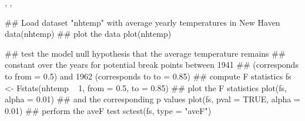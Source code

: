 \begin{SeeAlso}\relax
{}, ,
\end{SeeAlso}
\begin{Examples}
\begin{ExampleCode}
## Load dataset "nhtemp" with average yearly temperatures in New Haven
data(nhtemp)
## plot the data
plot(nhtemp)

## test the model null hypothesis that the average temperature remains
## constant over the years for potential break points between 1941
## (corresponds to from = 0.5) and 1962 (corresponds to to = 0.85)
## compute F statistics
fs <- Fstats(nhtemp ~ 1, from = 0.5, to = 0.85)
## plot the F statistics
plot(fs, alpha = 0.01)
## and the corresponding p values
plot(fs, pval = TRUE, alpha = 0.01)
## perform the aveF test
sctest(fs, type = "aveF")
\end{ExampleCode}
\end{Examples}

